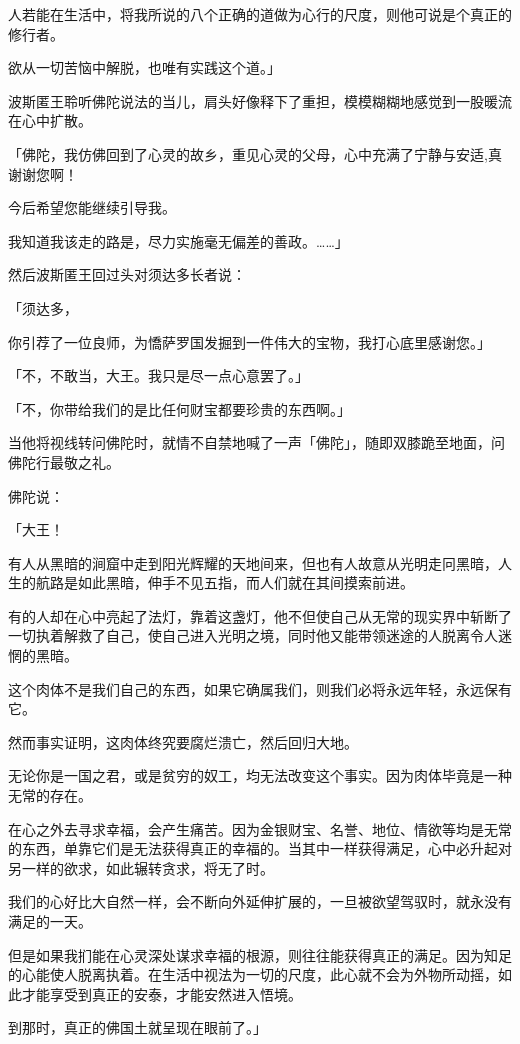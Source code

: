 \documentclass[twoside,openany]{book}
\begin{document}
人若能在生活中，将我所说的八个正确的道做为心行的尺度，则他可说是个真正的修行者。

欲从一切苦恼中解脱，也唯有实践这个道。」

波斯匿王聆听佛陀说法的当儿，肩头好像释下了重担，模模糊糊地感觉到一股暖流在心中扩散。

「佛陀，我仿佛回到了心灵的故乡，重见心灵的父母，心中充满了宁静与安适,真谢谢您啊！

今后希望您能继续引导我。

我知道我该走的路是，尽力实施毫无偏差的善政。……」

然后波斯匿王回过头对须达多长者说：

「须达多，

你引荐了一位良师，为憍萨罗国发掘到一件伟大的宝物，我打心底里感谢您。」

「不，不敢当，大王。我只是尽一点心意罢了。」

「不，你带给我们的是比任何财宝都要珍贵的东西啊。」

当他将视线转问佛陀时，就情不自禁地喊了一声「佛陀」，随即双膝跪至地面，问佛陀行最敬之礼。

佛陀说：

「大王！

有人从黑暗的涧窟中走到阳光辉耀的天地间来，但也有人故意从光明走冋黑暗，人生的航路是如此黑暗，伸手不见五指，而人们就在其间摸索前进。

有的人却在心中亮起了法灯，靠着这盏灯，他不但使自己从无常的现实界中斩断了一切执着解救了自己，使自己进入光明之境，同时他又能带领迷途的人脱离令人迷惘的黑暗。

这个肉体不是我们自己的东西，如果它确属我们，则我们必将永远年轻，永远保有它。

然而事实证明，这肉体终究要腐烂溃亡，然后回归大地。

无论你是一国之君，或是贫穷的奴工，均无法改变这个事实。因为肉体毕竟是一种无常的存在。

在心之外去寻求幸福，会产生痛苦。因为金银财宝、名誉、地位、情欲等均是无常的东西，单靠它们是无法获得真正的幸福的。当其中一样获得满足，心中必升起对另一样的欲求，如此辗转贪求，将无了时。

我们的心好比大自然一样，会不断向外延伸扩展的，一旦被欲望驾驭时，就永没有满足的一天。

但是如果我扪能在心灵深处谋求幸福的根源，则往往能获得真正的满足。因为知足的心能使人脱离执着。在生活中视法为一切的尺度，此心就不会为外物所动摇，如此才能享受到真正的安泰，才能安然进入悟境。

到那时，真正的佛国土就呈现在眼前了。」
\end{document}
